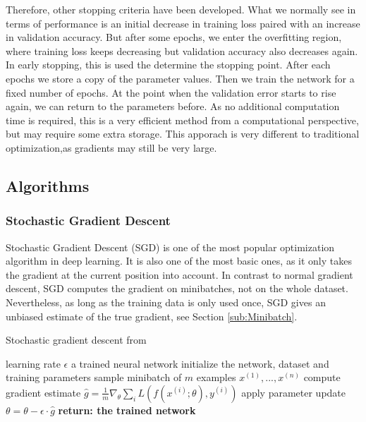 Therefore, other stopping criteria have been developed. What we normally see in
terms of performance is an initial decrease in training loss paired with an
increase in validation accuracy. But after some epochs, we enter the overfitting
region, where training loss keeps decreasing but validation accuracy also
decreases again. In early stopping, this is used the determine the stopping
point. After each epochs we store a copy of the parameter values. Then we train
the network for a fixed number of epochs. At the point when the validation error
starts to rise again, we can return to the parameters before. As no additional
computation time is required, this is a very efficient method from a
computational perspective, but may require some extra storage. This apporach is
very different to traditional optimization,as gradients may still be very large.



\subsection{Algorithms}
\subsubsection{Stochastic Gradient Descent}\label{SGD}
Stochastic Gradient Descent (SGD) is one of the most popular optimization
algorithm in deep learning. It is also one of the most basic ones, as it only
takes the gradient at the current position into account. In contrast to normal
gradient descent, SGD computes the gradient on minibatches, not on the whole
dataset. Nevertheless, as long as the training data is only used once, SGD gives
an unbiased estimate of the true gradient, see Section \ref{sub:Minibatch}. 

\begin{algorithm}\label{alg:SGD}
    \begin{algorithmic}[1]
        \caption{Stochastic gradient descent from \cite{Goodfellow-et-al-2016}}
        \REQUIRE learning rate $\epsilon$
        \ENSURE a trained neural network
        \STATE initialize the network, dataset and training parameters
            \STATE sample minibatch of $m$ examples ${x^{(1)}, ... ,x^{(n)}}$
            \STATE compute gradient estimate $\hat{g}=\frac{1}{m} \nabla_\theta \sum_i L(f(x^{(i)};\theta),y^{(i)})$
            \STATE apply parameter update $\theta=\theta-\epsilon\cdot\hat{g}$
        \ENDWHILE
        \STATE \textbf{return: the trained network}
    \end{algorithmic}
\end{algorithm}

